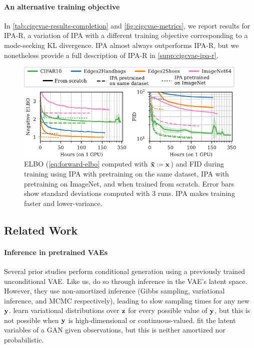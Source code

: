 \paragraph{An alternative training objective}
In \cref{tab:cigcvae-results-completion} and \cref{fig:cigcvae-metrics}, we report results for
IPA-R, a variation of IPA with a different training objective corresponding to a
mode-seeking KL divergence. IPA almost always outperforms IPA-R, but we
nonetheless provide a full description of IPA-R in \cref{supp:cigcvae-ipa-r}.

\begin{figure}[t]
  \vspace{-.1cm}
  \centering
  \includegraphics[scale=1]{figs/cigcvae/training-both}
  \caption{ELBO (\cref{eq:forward-elbo} computed with $\mathbf{\tilde{x}}{} := {\mathbf{x}}$) and
    FID during training using IPA with pretraining on the same dataset, IPA with
    pretraining on ImageNet, and when trained from scratch. Error bars show
    standard deviations computed with 3 runs. IPA makes training faster and
    lower-variance.}
  \label{fig:cigcvae-training}
  \vspace{-.3cm}
\end{figure}


\subsection{Related Work}
\paragraph{Inference in pretrained VAEs}
Several prior studies perform conditional generation using a previously trained
unconditional VAE.
%
Like us, \citet{rezende2014stochastic,nguyen2016plug,wu2018conditional} do so
through inference in the VAE's latent space. However, they use non-amortized
inference (Gibbs sampling, variational inference, and MCMC respectively),
leading to slow sampling times for any new ${\mathbf{y}}$.
%
\citet{duan2019pre} learn variational distributions over ${\mathbf{z}}$ for every possible
value of ${\mathbf{y}}$, but this is not possible when ${\mathbf{y}}$ is
high-dimensional or continuous-valued.
%
\citet{yeh2017semantic} fit the latent variables of a GAN given observations,
but this is neither amortized nor probabilistic.
%

